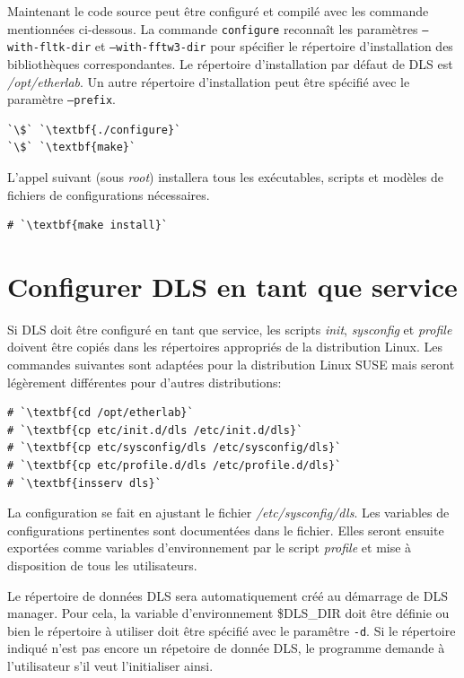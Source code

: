 \documentclass[a4paper,12pt,BCOR6mm,bibtotoc,idxtotoc]{scrbook}
\begin{document}
Maintenant le code source peut \^etre configur\'e et
compil\'e avec les commande mentionn\'ees ci-dessous.
La commande \texttt{configure} reconna\^it les param\`etres
\texttt{--with-fltk-dir} et \texttt{--with-fftw3-dir} pour sp\'ecifier
le r\'epertoire d'installation des biblioth\`eques correspondantes.
Le r\'epertoire d'installation par d\'efaut de DLS est  \textit{/opt/etherlab}.
Un autre r\'epertoire d'installation peut \^etre sp\'ecifi\'e avec le
param\`etre \texttt{--prefix}.

\begin{lstlisting}
`\$` `\textbf{./configure}`
`\$` `\textbf{make}`
\end{lstlisting}

L'appel suivant (sous \textit{root}) installera tous les
ex\'ecutables, scripts et mod\`eles de fichiers de configurations
n\'ecessaires.

\begin{lstlisting}
# `\textbf{make install}`
\end{lstlisting}



\section{Configurer DLS en tant que service}

Si DLS doit \^etre configur\'e en tant que service, les scripts
\textit{init}, \textit{sysconfig} et \textit{profile} doivent \^etre
copi\'es dans les r\'epertoires appropri\'es de la distribution Linux.
Les commandes suivantes sont adapt\'ees pour la distribution Linux
SUSE mais seront l\'eg\`erement diff\'erentes pour d'autres
distributions:

\begin{lstlisting}
# `\textbf{cd /opt/etherlab}`
# `\textbf{cp etc/init.d/dls /etc/init.d/dls}`
# `\textbf{cp etc/sysconfig/dls /etc/sysconfig/dls}`
# `\textbf{cp etc/profile.d/dls /etc/profile.d/dls}`
# `\textbf{insserv dls}`
\end{lstlisting}

La configuration se fait en ajustant le fichier
\textit{/etc/sysconfig/dls}. Les variables de configurations
pertinentes sont document\'ees dans le fichier. Elles seront ensuite
export\'ees comme variables d'environnement par le script \textit{profile}
et mise \`a disposition de tous les utilisateurs.

Le r\'epertoire de donn\'ees DLS sera automatiquement cr\'e\'e au
d\'emarrage de DLS manager.  Pour cela, la variable d'environnement
\$DLS\_DIR doit \^etre d\'efinie ou bien le
r\'epertoire \`a utiliser doit \^etre sp\'ecifi\'e avec le param\^etre
\texttt{-d}.  Si le r\'epertoire indiqu\'e n'est pas encore un
r\'epetoire de donn\'ee DLS, le programme demande \`a l'utilisateur
s'il veut l'initialiser ainsi.
\end{document}

